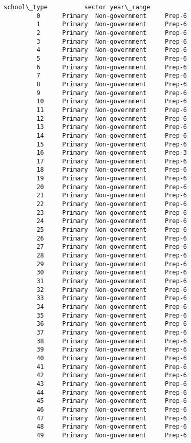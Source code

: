 \documentclass[11pt]{article}
\begin{document}
\begin{Verbatim}[commandchars=\\\{\}]
            school\_type          sector year\_range  
         0      Primary  Non-government     Prep-6  
         1      Primary  Non-government     Prep-6  
         2      Primary  Non-government     Prep-6  
         3      Primary  Non-government     Prep-6  
         4      Primary  Non-government     Prep-6  
         5      Primary  Non-government     Prep-6  
         6      Primary  Non-government     Prep-6  
         7      Primary  Non-government     Prep-6  
         8      Primary  Non-government     Prep-6  
         9      Primary  Non-government     Prep-6  
         10     Primary  Non-government     Prep-6  
         11     Primary  Non-government     Prep-6  
         12     Primary  Non-government     Prep-6  
         13     Primary  Non-government     Prep-6  
         14     Primary  Non-government     Prep-6  
         15     Primary  Non-government     Prep-6  
         16     Primary  Non-government     Prep-3  
         17     Primary  Non-government     Prep-6  
         18     Primary  Non-government     Prep-6  
         19     Primary  Non-government     Prep-6  
         20     Primary  Non-government     Prep-6  
         21     Primary  Non-government     Prep-6  
         22     Primary  Non-government     Prep-6  
         23     Primary  Non-government     Prep-6  
         24     Primary  Non-government     Prep-6  
         25     Primary  Non-government     Prep-6  
         26     Primary  Non-government     Prep-6  
         27     Primary  Non-government     Prep-6  
         28     Primary  Non-government     Prep-6  
         29     Primary  Non-government     Prep-6  
         30     Primary  Non-government     Prep-6  
         31     Primary  Non-government     Prep-6  
         32     Primary  Non-government     Prep-6  
         33     Primary  Non-government     Prep-6  
         34     Primary  Non-government     Prep-6  
         35     Primary  Non-government     Prep-6  
         36     Primary  Non-government     Prep-6  
         37     Primary  Non-government     Prep-6  
         38     Primary  Non-government     Prep-6  
         39     Primary  Non-government     Prep-6  
         40     Primary  Non-government     Prep-6  
         41     Primary  Non-government     Prep-6  
         42     Primary  Non-government     Prep-6  
         43     Primary  Non-government     Prep-6  
         44     Primary  Non-government     Prep-6  
         45     Primary  Non-government     Prep-6  
         46     Primary  Non-government     Prep-6  
         47     Primary  Non-government     Prep-6  
         48     Primary  Non-government     Prep-6  
         49     Primary  Non-government     Prep-6  
\end{Verbatim}
            
\end{document}
